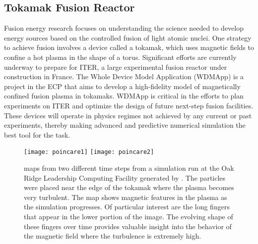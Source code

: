 \subsection{Tokamak Fusion Reactor}


Fusion energy research focuses on understanding the science needed to develop energy sources based on the controlled fusion of light atomic nuclei. One strategy to achieve fusion involves a device called a tokamak, which uses magnetic fields to confine a hot plasma in the shape of a torus.
Significant efforts are currently underway to prepare for ITER, a large experimental fusion reactor under construction in France.
The Whole Device Model Application (WDMApp) is a project in the ECP that aims to develop a high-fidelity model of magnetically confined fusion plasma in tokamaks. 
WDMApp is critical in the efforts to plan experiments on ITER and optimize the design of future next-step fusion facilities. These devices will operate in physics regimes not achieved by any current or past experiments, thereby making advanced and predictive numerical simulation the best tool for the task.




\begin{figure*}[tb]
  \centering
  \texttt{[image: poincare1]}
  \texttt{[image: poincare2]}
  \caption{\poincare maps from two different time steps from a simulation run at the Oak Ridge Leadership Computing Facility generated by \vtkm.  The particles were placed near the edge of the tokamak where the plasma becomes very turbulent. The \poincare map shows magnetic features in the plasma as the simulation progresses. Of particular interest are the long fingers that appear in the lower portion of the image. The evolving shape of these fingers over time provides valuable insight into the behavior of the magnetic field where the turbulence is extremely high. }
  \label{fig:poincare}
\end{figure*}

